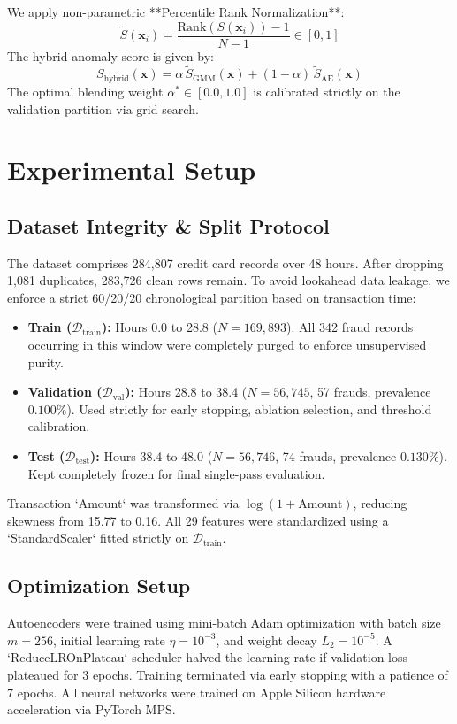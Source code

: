 \documentclass[10pt,journal,compsoc]{IEEEtran}
\begin{document}
We apply non-parametric **Percentile Rank Normalization**:
\begin{equation}
    \widetilde{S}(\mathbf{x}_i) = \frac{\text{Rank}(S(\mathbf{x}_i)) - 1}{N - 1} \in [0, 1]
\end{equation}
The hybrid anomaly score is given by:
\begin{equation}
    S_{\text{hybrid}}(\mathbf{x}) = \alpha \, \widetilde{S}_{\text{GMM}}(\mathbf{x}) + (1 - \alpha) \, \widetilde{S}_{\text{AE}}(\mathbf{x})
\end{equation}
The optimal blending weight $\alpha^* \in [0.0, 1.0]$ is calibrated strictly on the validation partition via grid search.

\section{Experimental Setup}
\subsection{Dataset Integrity \& Split Protocol}
The dataset comprises 284,807 credit card records over 48 hours. After dropping 1,081 duplicates, 283,726 clean rows remain. To avoid lookahead data leakage, we enforce a strict 60/20/20 chronological partition based on transaction time:
\begin{itemize}
    \item \textbf{Train ($\mathcal{D}_{\text{train}}$):} Hours 0.0 to 28.8 ($N=169,893$). All 342 fraud records occurring in this window were completely purged to enforce unsupervised purity.
    \item \textbf{Validation ($\mathcal{D}_{\text{val}}$):} Hours 28.8 to 38.4 ($N=56,745$, 57 frauds, prevalence $0.100\%$). Used strictly for early stopping, ablation selection, and threshold calibration.
    \item \textbf{Test ($\mathcal{D}_{\text{test}}$):} Hours 38.4 to 48.0 ($N=56,746$, 74 frauds, prevalence $0.130\%$). Kept completely frozen for final single-pass evaluation.
\end{itemize}

Transaction `Amount` was transformed via $\log(1 + \text{Amount})$, reducing skewness from 15.77 to 0.16. All 29 features were standardized using a `StandardScaler` fitted strictly on $\mathcal{D}_{\text{train}}$.

\subsection{Optimization Setup}
Autoencoders were trained using mini-batch Adam optimization with batch size $m=256$, initial learning rate $\eta = 10^{-3}$, and weight decay $L_2 = 10^{-5}$. A `ReduceLROnPlateau` scheduler halved the learning rate if validation loss plateaued for 3 epochs. Training terminated via early stopping with a patience of 7 epochs. All neural networks were trained on Apple Silicon hardware acceleration via PyTorch MPS.
\end{document}
